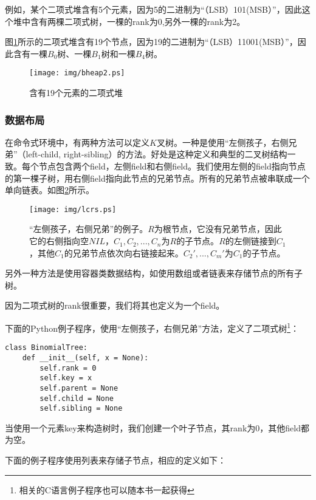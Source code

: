 \documentclass[UTF8]{article}
\begin{document}
例如，某个二项式堆含有5个元素，因为5的二进制为“（LSB）101(MSB）”，因此这个堆中含有两棵二项式树，一棵的rank为0,另外一棵的rank为2。

图\ref{fig:bheap2}所示的二项式堆含有19个节点，因为19的二进制为“（LSB）11001(MSB）”，因此含有一棵$B_0$树、一棵$B_1$树和一棵$B_4$树。

\begin{figure}[htbp]
  \centering
  \texttt{[image: img/bheap2.ps]}
  \caption{含有19个元素的二项式堆} \label{fig:bheap2}
\end{figure}

\subsubsection{数据布局}

在命令式环境中，有两种方法可以定义$K$叉树。一种是使用“左侧孩子，右侧兄弟”（left-child, right-sibling）的方法\cite{CLRS}。好处是这种定义和典型的二叉树结构一致。每个节点包含两个field，左侧field和右侧field。我们使用左侧的field指向节点的第一棵子树，用右侧field指向此节点的兄弟节点。所有的兄弟节点被串联成一个单向链表。如图\ref{fig:lcrs}所示。

\begin{figure}[htbp]
  \centering
  \texttt{[image: img/lcrs.ps]}
  \caption{“左侧孩子，右侧兄弟”的例子。$R$为根节点，它没有兄弟节点，因此它的右侧指向空$NIL$，$C_1, C_2, ..., C_n$为$R$的子节点。$R$的左侧链接到$C_1$，其他$C_1$的兄弟节点依次向右链接起来。$C_2', ..., C_m'$为$C_1$的子节点。} \label{fig:lcrs}
\end{figure}

另外一种方法是使用容器类数据结构，如使用数组或者链表来存储节点的所有子树。

因为二项式树的rank很重要，我们将其也定义为一个field。

下面的Python例子程序，使用“左侧孩子，右侧兄弟”方法，定义了二项式树\footnote{相关的C语言例子程序也可以随本书一起获得}：

\lstset{language=Python}
\begin{lstlisting}
class BinomialTree:
    def __init__(self, x = None):
        self.rank = 0
        self.key = x
        self.parent = None
        self.child = None
        self.sibling = None
\end{lstlisting}

当使用一个元素key来构造树时，我们创建一个叶子节点，其rank为0，其他field都为空。

下面的例子程序使用列表来存储子节点，相应的定义如下：
\end{document}
